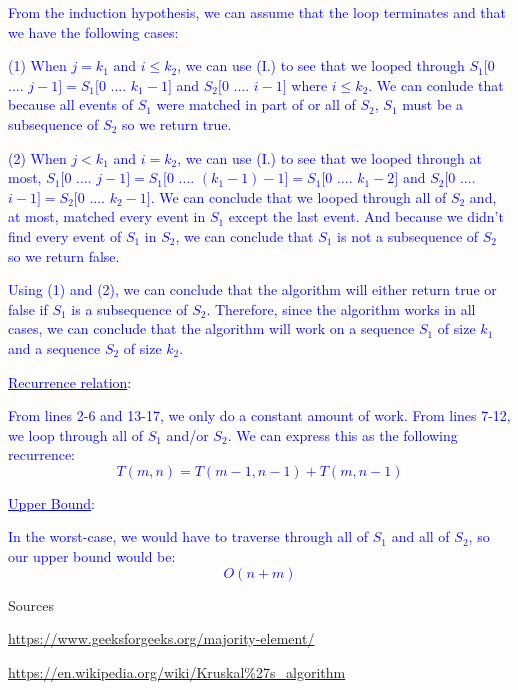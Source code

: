 \documentclass[11pt]{article}
\renewcommand{\blacksquare}{\textcolor{blue}{\openbox}}
\begin{document}
\begin{itemize}
\textcolor{blue}{ From the induction hypothesis, we can assume that the loop terminates and that we have the following cases:}

\textcolor{blue}{ (1) When $j = k_1$ and $i \leq k_2$, we can use (I.) to see that we looped through $S_1[0$ .... $j-1] = S_1[0$ .... $k_1-1]$ and $S_2[0$ .... $i-1]$ where $i \leq k_2$. We can conlude that because all events of $S_1$ were matched in part of or all of $S_2$, $S_1$ must be a subsequence of $S_2$ so we return true.}

\textcolor{blue}{ (2) When $j < k_1$ and $i = k_2$, we can use (I.) to see that we looped through at most, $S_1[0$ .... $j-1] = S_1[0$ .... $(k_1 - 1) -1] = S_1[0$ .... $k_1-2]$ and $S_2[0$ .... $i-1] = S_2[0$ .... $k_2-1]$. We can conclude that we looped through all of $S_2$ and, at most, matched every event in $S_1$ except the last event. And because we didn't find every event of $S_1$ in $S_2$, we can conclude that $S_1$ is not a subsequence of $S_2$ so we return false.}

\textcolor{blue}{ Using (1) and (2), we can conclude that the algorithm will either return true or false if $S_1$ is a subsequence of $S_2$. Therefore, since the algorithm works in all cases, we can conclude that the algorithm will work on a sequence $S_1$ of size $k_1$ and a sequence $S_2$ of size $k_2$.\hspace{5cm}\blacksquare\\}

\textcolor{blue}{ \underline{Recurrence relation}:}

\textcolor{blue}{ From lines 2-6 and 13-17, we only do a constant amount of work. From lines 7-12, we loop through all of $S_1$ and/or $S_2$. We can express this as the following recurrence: $$\boxed{T(m, n) = T(m - 1, n - 1) + T(m , n - 1)}$$}

\textcolor{blue}{ \underline{Upper Bound}:}

\textcolor{blue}{ In the worst-case, we would have to traverse through all of $S_1$ and all of $S_2$, so our upper bound would be:$$\boxed{O(n + m)}$$}

\end{itemize}

\begin{center}
Sources
\end{center}

\url{https://www.geeksforgeeks.org/majority-element/}

\url{https://en.wikipedia.org/wiki/Kruskal\%27s_algorithm}
\end{document}

